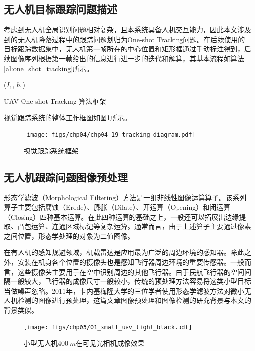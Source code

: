 \subsection{无人机目标跟踪问题描述}
考虑到无人机全局识别问题相对复杂，且本系统具备人机交互能力，因此本文涉及到的无人机降落过程中的跟踪问题划归为One-shot Tracking问题。在后续使用的目标跟踪数据集中，无人机第一帧所在的中心位置和矩形框通过手动标注得到，后续图像序列根据第一帧给出的信息进行进一步的迭代和解算，其基本流程如算法\ref{al:one_shot_tracking}所示。
\begin{algorithm2e}[h]
	\SetAlgoLined
	\BlankLine
	\Initialization($I_1$, $b_1$)\;
	\caption{UAV One-shot Tracking 算法框架}
	\label{al:one_shot_tracking}
\end{algorithm2e}
视觉跟踪系统的整体工作框图如图\ref{fig:chp04_19_tracking_diagram}所示。
\begin{figure}[ht]   
	\centering
	\texttt{[image: figs/chp04/chp04\_19\_tracking\_diagram.pdf]}
	\caption{视觉跟踪系统框架}
	\label{fig:chp04_19_tracking_diagram}
\end{figure}


\subsection{无人机跟踪问题图像预处理}
形态学滤波（Morphological Filtering）方法是一组非线性图像运算算子。该系列算子主要包括腐蚀（Erode）、膨胀（Dilate）、开运算（Opening）和闭运算（Closing）四种基本运算。在此四种运算的基础之上，一般还可以拓展出边缘提取、凸包运算、连通区域标记等复杂运算。通常而言，由于上述算子主要通过像素之间位置，形态学处理的对象为二值图像。

在有人机的感知规避领域，机载雷达是应用最为广泛的周边环境的感知器。除此之外，安装在机身各个位置的摄像头也是感知飞行器周边环境的重要传感器。一般而言，这些摄像头主要用于在空中识别周边的其他飞行器。由于民航飞行器的空间间隔一般较大，飞行器的成像尺寸一般较小，传统的预处理方法容易将这类小型目标当做噪声忽略。2011年，卡内基梅隆大学的三位学者使用形态学滤波方法对微小无人机检测的图像进行预处理\cite{dey2011cascaded}，这篇文章图像预处理和图像检测的研究背景与本文的背景类似。
\begin{figure}[ht]   
	\centering
	\texttt{[image: figs/chp03/01\_small\_uav\_light\_black.pdf]}
	\caption{小型无人机$400\ m$在可见光相机成像效果}
	\label{fig:01_small_uav_light_black}
\end{figure}

